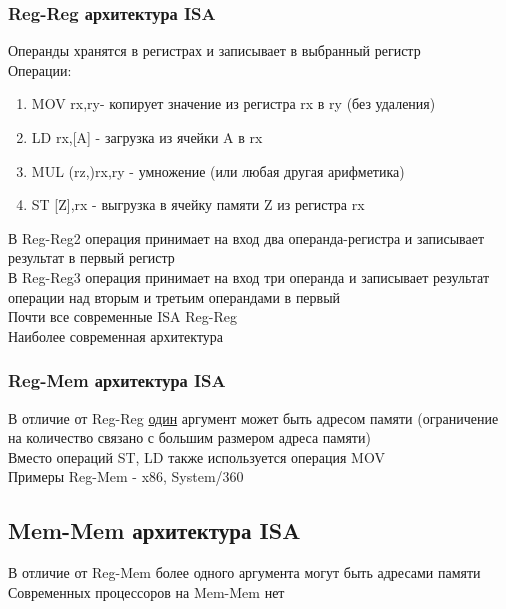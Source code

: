 \documentclass[12pt]{article}
\begin{document}
\subsubsection{Reg-Reg архитектура ISA}
Операнды хранятся в регистрах и записывает в выбранный регистр\\
Операции:
\begin{enumerate}
    \item MOV rx,ry- копирует значение из регистра rx в ry (без удаления)
    \item LD rx,[A]  - загрузка из ячейки A в rx
    \item MUL (rz,)rx,ry - умножение (или любая другая арифметика)
    \item ST [Z],rx - выгрузка в ячейку памяти Z из регистра rx
\end{enumerate}
В Reg-Reg2 операция принимает на вход два операнда-регистра и записывает результат в первый регистр\\
В Reg-Reg3 операция принимает на вход три операнда и записывает результат операции над вторым и третьим операндами в первый\\
Почти все современные ISA Reg-Reg\\
Наиболее современная архитектура
\subsubsection{Reg-Mem архитектура ISA}
В отличие от Reg-Reg \underline{один} аргумент может быть адресом памяти (ограничение на количество связано с большим размером адреса памяти)\\
Вместо операций ST, LD также используется операция MOV\\
Примеры Reg-Mem - x86, System/360
\subsection{Mem-Mem архитектура ISA}
В отличие от Reg-Mem более одного аргумента могут быть адресами памяти\\
Современных процессоров на Mem-Mem нет
\end{document}

